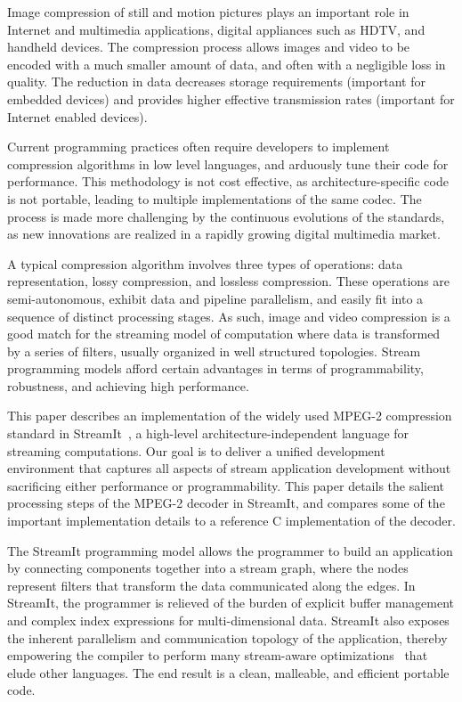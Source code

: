 
Image compression of still and motion pictures plays an important role
in Internet and multimedia applications, digital appliances such as
HDTV, and handheld devices. The compression process allows images and
video to be encoded with a much smaller amount of data, and often with
a negligible loss in quality. The reduction in data decreases storage
requirements (important for embedded devices) and provides higher
effective transmission rates (important for Internet enabled devices).

Current programming practices often require developers to implement
compression algorithms in low level languages, and arduously
tune their code for performance. This methodology is not cost
effective, as architecture-specific code is not portable, leading to
multiple implementations of the same codec. The process is made more
challenging by the continuous evolutions of the standards, as new
innovations are realized in a rapidly growing digital multimedia
market.

A typical compression algorithm involves three types of operations:
data representation, lossy compression, and lossless
compression. These operations are semi-autonomous, exhibit data and
pipeline parallelism, and easily fit into a sequence of distinct
processing stages. As such, image and video compression is a good
match for the streaming model of computation where data is transformed
by a series of filters, usually organized in well structured
topologies.  Stream programming models afford certain advantages in
terms of programmability, robustness, and achieving high performance.

This paper describes an implementation of the widely used MPEG-2
compression standard in StreamIt~\cite{streamitcc}, a high-level
architecture-independent language for streaming computations. Our goal
is to deliver a unified development environment that captures all
aspects of stream application development without sacrificing either
performance or programmability. This paper details the salient
processing steps of the MPEG-2 decoder in StreamIt, and compares some
of the important implementation details to a reference C
implementation of the decoder.

The StreamIt programming model allows the programmer to build an
application by connecting components together into a stream graph,
where the nodes represent filters that transform the data communicated
along the edges. In StreamIt, the programmer is relieved of the burden
of explicit buffer management and complex index expressions for
multi-dimensional data.  StreamIt also exposes the inherent
parallelism and communication topology of the application, thereby
empowering the compiler to perform many stream-aware
optimizations~\cite{agrawal05cases,gordon02asplos,lamb03pldi,sermulins05lctes}
that elude other languages. The end result is a clean, malleable,
and efficient portable code.
